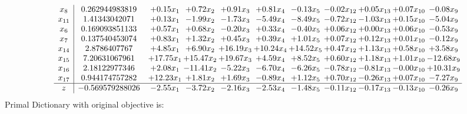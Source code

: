 \documentclass[9pt]{article}
\begin{document}
\[\begin{array}{c| c c@{\hskip 2pt} c@{\hskip 2pt} c@{\hskip 2pt} c@{\hskip 2pt} c@{\hskip 2pt} c@{\hskip 2pt} c@{\hskip 2pt} c@{\hskip 2pt} c@{\hskip 2pt} }
 x_{8}   &  0.262944983819 & +  0.15 x_{1} & +  0.72 x_{2} & +  0.91 x_{3} & +  0.81 x_{4} & -0.13 x_{5} & -0.02 x_{12} & +  0.05 x_{13} & +  0.07 x_{10} & -0.08 x_{9}\\
 x_{11}   &  1.41343042071 & +  0.13 x_{1} & -1.99 x_{2} & -1.73 x_{3} & -5.49 x_{4} & -8.49 x_{5} & -0.72 x_{12} & -1.03 x_{13} & +  0.15 x_{10} & -5.04 x_{9}\\
 x_{6}   &  0.169093851133 & +  0.57 x_{1} & +  0.68 x_{2} & -0.20 x_{3} & +  0.33 x_{4} & -0.40 x_{5} & +  0.06 x_{12} & +  0.00 x_{13} & +  0.06 x_{10} & -0.53 x_{9}\\
 x_{7}   &  0.137540453074 & +  0.83 x_{1} & +  1.32 x_{2} & +  0.45 x_{3} & +  0.39 x_{4} & +  1.01 x_{5} & +  0.07 x_{12} & +  0.12 x_{13} & +  0.01 x_{10} & -0.12 x_{9}\\
 x_{14}   &  2.8786407767 & +  4.85 x_{1} & +  6.90 x_{2} & + 16.19 x_{3} & + 10.24 x_{4} & + 14.52 x_{5} & +  0.47 x_{12} & +  1.13 x_{13} & +  0.58 x_{10} & +  3.58 x_{9}\\
 x_{15}   &  7.20631067961 & + 17.75 x_{1} & + 15.47 x_{2} & + 19.67 x_{3} & +  4.59 x_{4} & +  8.52 x_{5} & +  0.60 x_{12} & +  1.18 x_{13} & +  1.01 x_{10} & -12.68 x_{9}\\
 x_{16}   &  2.18122977346 & +  2.08 x_{1} & -11.41 x_{2} & -5.22 x_{3} & -6.70 x_{4} & -6.26 x_{5} & -0.78 x_{12} & -0.81 x_{13} & -0.00 x_{10} & + 10.31 x_{9}\\
 x_{17}   &  0.944174757282 & + 12.23 x_{1} & +  1.81 x_{2} & +  1.69 x_{3} & -0.89 x_{4} & +  1.12 x_{5} & +  0.70 x_{12} & -0.26 x_{13} & +  0.07 x_{10} & -7.27 x_{9}\\
\hline
z    &  -0.569579288026 & -2.55 x_{1} & -3.72 x_{2} & -2.16 x_{3} & -2.53 x_{4} & -1.48 x_{5} & -0.11 x_{12} & -0.17 x_{13} & -0.13 x_{10} & -0.26 x_{9}\\
\end{array}\]
Primal Dictionary with original objective is:
\end{document}
